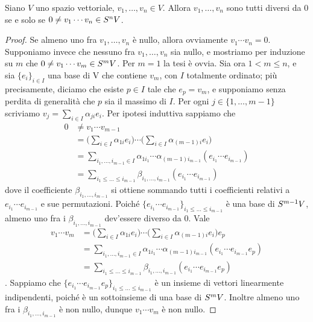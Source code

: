 \begin{proposition}
Siano $V$ uno spazio vettoriale, $v_1,\ldots, v_n\in V$. Allora $v_1,\ldots, v_n$ sono tutti diversi da $0$ se e solo se $0\neq v_1\cdots v_n\in S^nV$.
\end{proposition}
\begin{proof}
Se almeno uno fra $v_1,\ldots,v_n$ è nullo, allora ovviamente $v_1\cdots v_n=0$. Supponiamo invece che nessuno fra $v_1,\ldots,v_n$ sia nullo, e mostriamo per induzione su $m$ che $0\neq v_1\cdots v_m\in S^mV$. Per $m=1$ la tesi è ovvia. Sia ora $1<m\le n$, e sia $\{e_i\}_{i\in I}$ una base di V che contiene $v_m$, con $I$ totalmente ordinato; più precisamente, diciamo che esiste $p\in I$ tale che $e_p=v_m$, e supponiamo senza perdita di generalità che $p$ sia il massimo di $I$. Per ogni $j\in\{1,\ldots,m-1\}$ scriviamo $v_j=\sum_{i\in I}\alpha_{ji}e_i$. Per ipotesi induttiva sappiamo che
\begin{align*}
0&\neq v_1\cdots v_{m-1}\\
&=\biggl(\sum_{i\in I}\alpha_{1i}e_i\biggr)\cdots\biggl(\sum_{i\in I}\alpha_{(m-1)i}e_i\biggr)\\
&=\sum_{i_1,\ldots,i_{m-1}\in I}\alpha_{1i_1}\cdots\alpha_{(m-1)i_{m-1}}(e_{i_1}\cdots e_{i_{m-1}})\\
&=\sum_{i_1\le\ldots\le i_{m-1}}\beta_{i_1,\ldots,i_{m-1}}(e_{i_1}\cdots e_{i_{m-1}})
\end{align*}
dove il coefficiente $\beta_{i_1,\ldots,i_{m-1}}$ si ottiene sommando tutti i coefficienti relativi a $e_{i_1}\cdots e_{i_{m-1}}$ e sue permutazioni. Poiché $\{e_{i_1}\cdots e_{i_{m-1}}\}_{i_1\le\ldots\le i_{m-1}}$ è una base di $S^{m-1}V$, almeno uno fra i $\beta_{i_1,\ldots,i_{m-1}}$ dev'essere diverso da 0. Vale
\begin{align*}
v_1\cdots v_m&=\biggl(\sum_{i\in I}\alpha_{1i}e_i\biggr)\cdots\biggl(\sum_{i\in I}\alpha_{(m-1)i}e_i\biggr)e_p\\
&=\sum_{i_1,\ldots,i_{m-1}\in I}\alpha_{1i_1}\cdots\alpha_{(m-1)i_{m-1}}(e_{i_1}\cdots e_{i_{m-1}}e_p)\\
&=\sum_{i_1\le\ldots\le i_{m-1}}\beta_{i_1,\ldots,i_{m-1}}(e_{i_1}\cdots e_{i_{m-1}}e_p)
\end{align*}
. Sappiamo che $\{e_{i_1}\cdots e_{i_{m-1}}e_p\}_{i_1\le\ldots\le i_{m-1}}$ è un insieme di vettori linearmente indipendenti, poiché è un sottoinsieme di una base di $S^mV$. Inoltre almeno uno fra i $\beta_{i_1,\ldots,i_{m-1}}$ è non nullo, dunque $v_1\cdots v_m$ è non nullo.
\end{proof}

